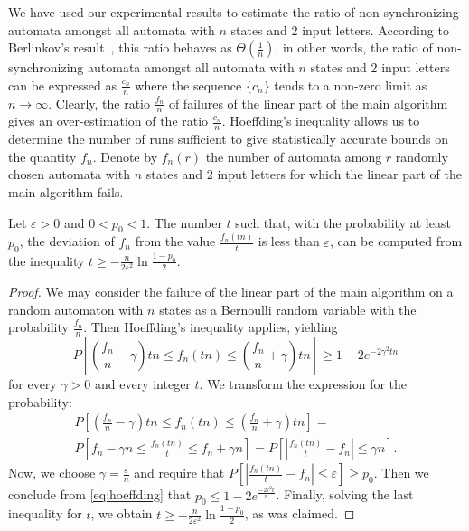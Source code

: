 \documentclass{jalc}
\begin{document}
We have used our experimental results to estimate the ratio of non-synchro\-niz\-ing automata amongst all automata with $n$ states and 2 input letters. According to Berlinkov's result~\cite[Theorem~1]{Berlinkov:preprint}, this ratio behaves as $\Theta(\frac{1}{n})$, in other words, the ratio of non-synchronizing automata amongst all automata with $n$ states and 2 input letters can be expressed as $\frac{c_n}n$ where the sequence $\{c_n\}$ tends to a non-zero limit as $n\to\infty$. Clearly, the ratio $\frac{f_n}n$ of failures of the linear part of the main algorithm gives an over-estimation of the ratio $\frac{c_n}n$. Hoeffding's inequality \cite{hoeffding} allows us to determine the number of runs sufficient to give statistically accurate bounds on the quantity $f_n$. Denote by $f_n(r)$ the number of automata among $r$ randomly chosen automata with $n$ states and 2 input letters for which the linear part of the main algorithm fails.

\begin{proposition}
\label{prop:estimation}
Let $\varepsilon>0$ and $0<p_0<1$. The number $t$ such that, with the probability at least $p_0$, the deviation of $f_n$ from the value $\frac{f_n(t n)}{t}$ is less than $\varepsilon$, can be computed from the inequality  $t\ge-\frac{n}{2\varepsilon^2}\ln{\frac{1-p_0}{2}}$.
\end{proposition}

\begin{proof}
We may consider the failure of the linear part of the main algorithm on a random automaton with $n$ states as a Bernoulli random variable with the probability $\frac{f_n}{n}$. Then Hoeffding's inequality applies, yielding
\begin{equation}
\label{eq:hoeffding}
P\left[\left(\frac{f_n}{n} - \gamma\right)t n \le f_n\left(t n\right) \le \left(\frac{f_n}{n} + \gamma\right)t n\right] \ge 1 - 2e^{-2 \gamma^2 tn}
\end{equation}
for every $\gamma>0$ and every integer $t$. We transform the expression for the probability:
\begin{multline*}
P\left[\left(\frac{f_n}{n} - \gamma\right)t n \le f_n\left(t n\right) \le \left(\frac{f_n}{n} + \gamma\right)t n\right] =\\
P\left[f_n - \gamma n \le \frac{f_n(t n)}{t} \le f_n + \gamma n\right] = P\left[\left|\frac{f_n(t n)}{t} - f_n\right| \le \gamma n\right].
\end{multline*}
Now, we choose $\gamma=\frac{\varepsilon}n$ and require that $P\left[\left|\frac{f_n(t n)}{t} - f_n\right| \le \varepsilon\right] \ge p_0$. Then we conclude from \eqref{eq:hoeffding} that $p_0 \le 1 - 2e^{\frac{-2\varepsilon^2t}{n}}$. Finally, solving the last inequality for $t$, we obtain
$t \geq -\frac{n}{2 \varepsilon^2} \ln{\frac{1-p_0}{2}}$, as was claimed.
\end{proof}
\end{document}
